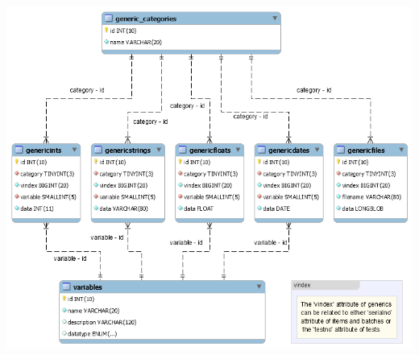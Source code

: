\begin{appendices}
	\newpage
	\includegraphics[width=1.0\textwidth]{img/mysql_schema_variables.png}
\end{appendices}